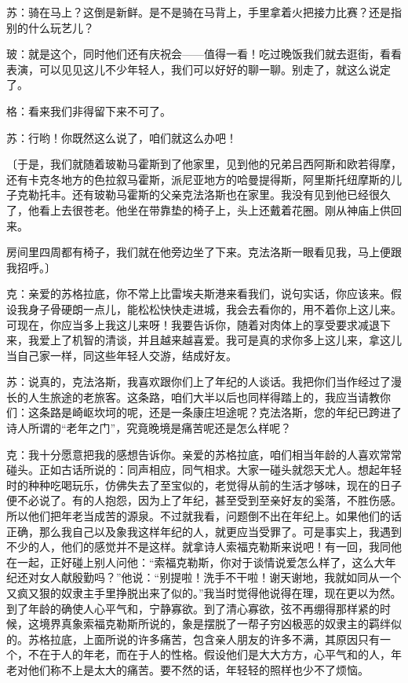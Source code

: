 \documentclass[11pt,oneside]{book}
\begin{document}
\begin{common-format}
苏：骑在马上？这倒是新鲜。是不是骑在马背上，手里拿着火把接力比赛？还是指别的什么玩艺儿？

玻：就是这个，同时他们还有庆祝会——值得一看！吃过晚饭我们就去逛街，看看表演，可以见见这儿不少年轻人，我们可以好好的聊一聊。别走了，就这么说定了。

格：看来我们非得留下来不可了。

苏：行哟！你既然这么说了，咱们就这么办吧！

〔于是，我们就随着玻勒马霍斯到了他家里，见到他的兄弟吕西阿斯和欧若得摩，还有卡克冬地方的色拉叙马霍斯，派尼亚地方的哈曼提得斯，阿里斯托纽摩斯的儿子克勒托丰。还有玻勒马霍斯的父亲克法洛斯也在家里。我没有见到他已经很久了，他看上去很苍老。他坐在带靠垫的椅子上，头上还戴着花圈。刚从神庙上供回来。

房间里四周都有椅子，我们就在他旁边坐了下来。克法洛斯一眼看见我，马上便跟我招呼。〕


克：亲爱的苏格拉底，你不常上比雷埃夫斯港来看我们，说句实话，你应该来。假设我身子骨硬朗一点儿，能松松快快走进城，我会去看你的，用不着你上这儿来。可现在，你应当多上我这儿来呀！我要告诉你，随着对肉体上的享受要求减退下来，我爱上了机智的清谈，并且越来越喜爱。我可是真的求你多上这儿来，拿这儿当自己家一样，同这些年轻人交游，结成好友。

苏：说真的，克法洛斯，我喜欢跟你们上了年纪的人谈话。我把你们当作经过了漫长的人生旅途的老旅客。这条路，咱们大半以后也同样得踏上的，我应当请教你们：这条路是崎岖坎坷的呢，还是一条康庄坦途呢？克法洛斯，您的年纪已跨进了诗人所谓的“老年之门”，究竟晚境是痛苦呢还是怎么样呢？

克：我十分愿意把我的感想告诉你。亲爱的苏格拉底，咱们相当年龄的人喜欢常常碰头。正如古话所说的：同声相应，同气相求。大家一碰头就怨天尤人。想起年轻时的种种吃喝玩乐，仿佛失去了至宝似的，老觉得从前的生活才够味，现在的日子便不必说了。有的人抱怨，因为上了年纪，甚至受到至亲好友的奚落，不胜伤感。所以他们把年老当成苦的源泉。不过就我看，问题倒不出在年纪上。如果他们的话正确，那么我自己以及象我这样年纪的人，就更应当受罪了。可是事实上，我遇到不少的人，他们的感觉并不是这样。就拿诗人索福克勒斯来说吧！有一回，我同他在一起，正好碰上别人问他：“索福克勒斯，你对于谈情说爱怎么样了，这么大年纪还对女人献殷勤吗？”他说：“别提啦！洗手不干啦！谢天谢地，我就如同从一个又疯又狠的奴隶主手里挣脱出来了似的。”我当时觉得他说得在理，现在更以为然。到了年龄的确使人心平气和，宁静寡欲。到了清心寡欲，弦不再绷得那样紧的时候，这境界真象索福克勒斯所说的，象是摆脱了一帮子穷凶极恶的奴隶主的羁绊似的。苏格拉底，上面所说的许多痛苦，包含亲人朋友的许多不满，其原因只有一个，不在于人的年老，而在于人的性格。假设他们是大大方方，心平气和的人，年老对他们称不上是太大的痛苦。要不然的话，年轻轻的照样也少不了烦恼。


\end{common-format}
\end{document}
